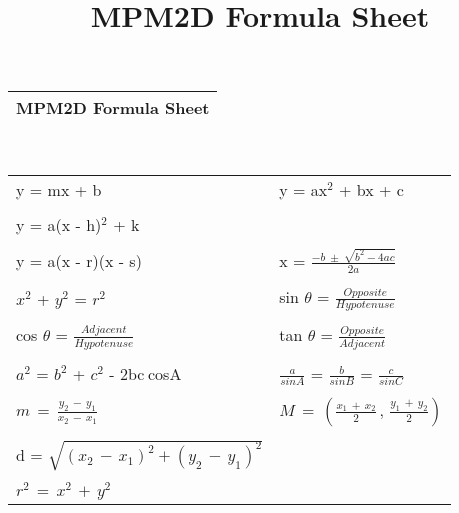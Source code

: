 \documentclass[30pt]{article}
\title{MPM2D Formula Sheet}
\begin{document}
\begin{LARGE}
\Huge
\begin{tabular}{ |l| }
  \hline
  \textbf{MPM2D Formula Sheet}\\
  \hline
\end{tabular}
\\

\Huge
\begin{tabular}{p{}p{}}
y = mx + b & y = ax$^2$ + bx + c  \
\\
\\

 y = a(x - h)$^2$ + k\\
\\
y = a(x - r)(x - s) & x = $\frac{-b \: \pm \: \sqrt {b^2 - 4ac}}{2a}$\\
\\
$x^2$ + $y^2$ = $r^2$ & sin $\theta$ = $\frac{Opposite}{Hypotenuse}$\\
 \\
 
cos $\theta$ = $\frac{Adjacent}{Hypotenuse}$ & tan $\theta$ = $\frac{Opposite}{Adjacent}$ 
\\
\\

$a^2$ = $b^2$ + $c^2$ - 2bc$\:$cosA & $\frac{a}{sinA}$ = $\frac{b}{sinB}$ = $\frac{c}{sinC}$\\
\\
$m \, = \, \frac{y_2 \, - \, y_1}{x_2 \, - \, x_1}$ & $M \, = \,\left(\frac{x_1 \, + \, x_2}{2} \, , \, \frac{y_1 \, + \, y_2}{2} \right)$\\
\\
\LARGE
d = $\sqrt{(x_2 \, - \, x_1)^2 + (y_2 \, - \, y_1)^2}$ & \\
\\
\Huge
$r^2 \, = \, x^2 \, + \, y^2$\\



\end{tabular}
\end{LARGE}
\end{document}
